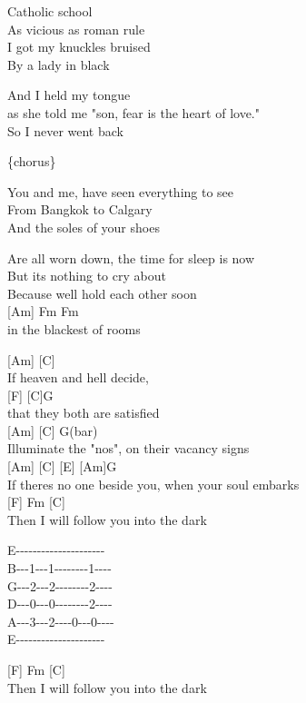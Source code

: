 \documentclass[
  letterpaper,
]{scrbook}
\begin{document}
Catholic school\\
As vicious as roman rule\\
I got my knuckles bruised\\
By a lady in black

And I held my tongue\\
as she told me "son, fear is the heart of love."\\
So I never went back

\{chorus\}

You and me, have seen everything to see\\
From Bangkok to Calgary\\
And the soles of your shoes

Are all worn down, the time for sleep is now\\
But it\textquotesingle s nothing to cry about\\
Because we\textquotesingle ll hold each other soon\\
{[}Am{]} Fm Fm\\
in the blackest of rooms

{[}Am{]} {[}C{]}\\
If heaven and hell decide,\\
{[}F{]} {[}C{]}G\\
that they both are satisfied\\
{[}Am{]} {[}C{]} G(bar)\\
Illuminate the "no\textquotesingle s", on their vacancy signs\\
{[}Am{]} {[}C{]} {[}E{]} {[}Am{]}G\\
If there\textquotesingle s no one beside you, when your soul embarks\\
{[}F{]} Fm {[}C{]}\\
Then I will follow you into the dark

E-\/-\/-\/-\/-\/-\/-\/-\/-\/-\/-\/-\/-\/-\/-\/-\/-\/-\/-\/-\/-\textbar{}\\
B-\/-\/-1-\/-\/-1-\/-\/-\/-\/-\/-\/-\/-1-\/-\/-\/-\textbar{}\\
G-\/-\/-2-\/-\/-2-\/-\/-\/-\/-\/-\/-\/-2-\/-\/-\/-\textbar{}\\
D-\/-\/-0-\/-\/-0-\/-\/-\/-\/-\/-\/-\/-2-\/-\/-\/-\textbar{}\\
A-\/-\/-3-\/-\/-2-\/-\/-\/-0-\/-\/-0-\/-\/-\/-\textbar{}\\
E-\/-\/-\/-\/-\/-\/-\/-\/-\/-\/-\/-\/-\/-\/-\/-\/-\/-\/-\/-\/-\textbar{}

{[}F{]} Fm {[}C{]}\\
Then I will follow you into the dark
\end{document}

